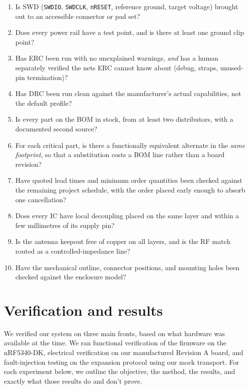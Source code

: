 \documentclass[12pt, a4paper]{article}
\begin{document}
\begin{enumerate}[label=\textbf{C\arabic*.}]
  \item Is SWD (\texttt{SWDIO}, \texttt{SWDCLK}, \texttt{nRESET}, reference ground, target voltage) brought out to an accessible connector or pad set?
  \item Does every power rail have a test point, and is there at least one ground clip point?
  \item Has ERC been run with no unexplained warnings, \emph{and} has a human separately verified the nets ERC cannot know about (debug, straps, unused-pin termination)?
  \item Has DRC been run clean against the manufacturer's actual capabilities, not the default profile?
  \item Is every part on the BOM in stock, from at least two distributors, with a documented second source?
  \item For each critical part, is there a functionally equivalent alternate in the \emph{same footprint}, so that a substitution costs a BOM line rather than a board revision?
  \item Have quoted lead times and minimum order quantities been checked against the remaining project schedule, with the order placed early enough to absorb one cancellation?
  \item Does every IC have local decoupling placed on the same layer and within a few millimetres of its supply pin?
  \item Is the antenna keepout free of copper on all layers, and is the RF match routed as a controlled-impedance line?
  \item Have the mechanical outline, connector positions, and mounting holes been checked against the enclosure model?
\end{enumerate}

\newpage
\section{Verification and results}
\label{sec:results}

We verified our system on three main fronts, based on what hardware was available at the time. We ran functional verification of the firmware on the nRF5340-DK, electrical verification on our manufactured Revision A board, and fault-injection testing on the expansion protocol using our mock transport. For each experiment below, we outline the objective, the method, the results, and exactly what those results do and don't prove.
\end{document}

